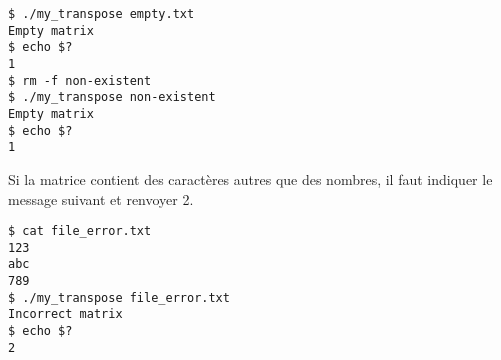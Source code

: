 \lstset{language=sh}
\begin{lstlisting}[frame=single,title={Cas d'erreur 1}]
$ ./my_transpose empty.txt
Empty matrix
$ echo $?
1
$ rm -f non-existent
$ ./my_transpose non-existent
Empty matrix
$ echo $?
1
\end{lstlisting}

\noindent Si la matrice contient des caractères autres que des nombres, il faut indiquer le message suivant et renvoyer 2.

\bigskip

\noindent {}

\bigskip

\lstset{language=sh}
\begin{lstlisting}[frame=single,title={Cas d'erreur 2}]
$ cat file_error.txt
123
abc
789
$ ./my_transpose file_error.txt
Incorrect matrix
$ echo $?
2
\end{lstlisting}

%
